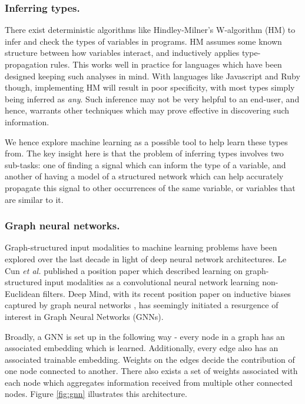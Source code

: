 \subsubsection{Inferring types.}
There exist deterministic algorithms like Hindley-Milner's W-algorithm (HM) to infer and check the types of variables in programs. HM assumes some known structure between how variables interact, and inductively applies type-propagation rules. This works well in practice for languages which have been designed keeping such analyses in mind. With languages like Javascript and Ruby though, implementing HM will result in poor specificity, with most types simply being inferred as \textit{any}. Such inference may not be very helpful to an end-user, and hence, warrants other techniques which may prove effective in discovering such information.

We hence explore machine learning as a possible tool to help learn these types from. The key insight here is that the problem of inferring types involves two sub-tasks: one of finding a signal which can inform the type of a variable, and another of having a model of a structured network which can help accurately propagate this signal to other occurrences of the same variable, or variables that are similar to it.

\subsubsection{Graph neural networks.}
Graph-structured input modalities to machine learning problems have been explored over the last decade in light of deep neural network architectures. Le Cun \textit{et al.} published a position paper \cite{henaff2015deep} which described learning on graph-structured input modalities as a convolutional neural network learning non-Euclidean filters. Deep Mind, with its recent position paper on inductive biases captured by graph neural networks \cite{deepmind2018graph}, has seemingly initiated a resurgence of interest in Graph Neural Networks (GNNs).

Broadly, a GNN is set up in the following way - every node in a graph has an associated embedding which is learned. Additionally, every edge also has an associated trainable embedding. Weights on the edges decide the contribution of one node connected to another. There also exists a set of weights associated with each node which aggregates information received from multiple other connected nodes. Figure \ref{fig:gnn} illustrates this architecture.

